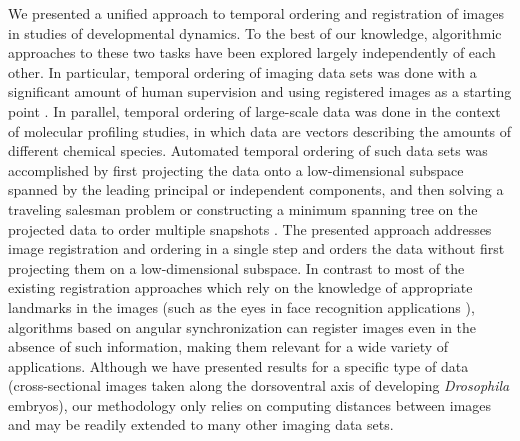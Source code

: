\documentclass{pnastwo}
\begin{document}
\begin{article}
We presented a unified approach to temporal ordering and registration of images in studies of developmental dynamics. 
%
To the best of our knowledge, algorithmic approaches to these two tasks have been explored largely independently of each other. 
%
In particular, temporal ordering of imaging data sets was done with a significant amount of human supervision and using registered images as a starting point \cite{yuan2014automated, surkova2008characterization}.  
%
In parallel, temporal ordering of large-scale data was done in the context of molecular profiling studies, in which data are vectors describing the amounts of different chemical species.
%
Automated temporal ordering of such data sets was accomplished by first projecting the data onto a low-dimensional subspace spanned by the leading principal or independent components, and then solving a traveling salesman problem or constructing a minimum spanning tree on the projected data to order multiple snapshots \cite{anavy2014blind, trapnell2014dynamics, gupta2008extracting}. 
%
The presented approach addresses image registration and ordering in a single step and orders the data without first projecting them on a low-dimensional subspace.
%
%
In contrast to most of the existing registration approaches which rely on the knowledge of appropriate landmarks in the images \cite{ian1998statistical} (such as the eyes in face recognition applications \cite{zhao2003face}), algorithms based on angular synchronization can register images even in the absence of such information, making them relevant for a wide variety of applications. 
%
Although we have presented results for a specific type of data (cross-sectional images taken along the dorsoventral axis of developing {\em Drosophila} embryos), our methodology only relies on computing distances between images and may be readily extended to many other imaging data sets. 


\end{article}
\end{document}
